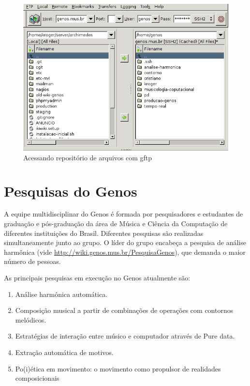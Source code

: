 \documentclass[12pt,brazil]{book}
\begin{document}
\begin{figure}
  \centering
  \includegraphics[scale=.7]{gftp-genos}
  \caption{Acessando repositório de arquivos com gftp}
  \label{fig:gftp}
\end{figure}


\chapter{Pesquisas do Genos}
\label{cha:pesquisas-do-genos}

A equipe multidisciplinar do Genos é formada por pesquisadores e
estudantes de graduação e pós-graduação da área de Música e Ciência da
Computação de diferentes instituições do Brasil. Diferentes pesquisas
são realizadas simultaneamente junto ao grupo. O líder do grupo
encabeça a pesquisa de análise harmônica (vide
\url{http://wiki.genos.mus.br/PesquisaGenos}), que demanda o maior
número de pessoas.

As principais pesquisas em execução no Genos atualmente são:

\begin{enumerate}
\item Análise harmônica automática.
\item Composição musical a partir de combinações de operações com
  contornos melódicos.
\item Estratégias de interação entre músico e computador através de
  Pure data.
\item Extração automática de motivos.
\item Po(i)ética em movimento: o movimento como propulsor de
  realidades composicionais
\end{enumerate}
\end{document}
